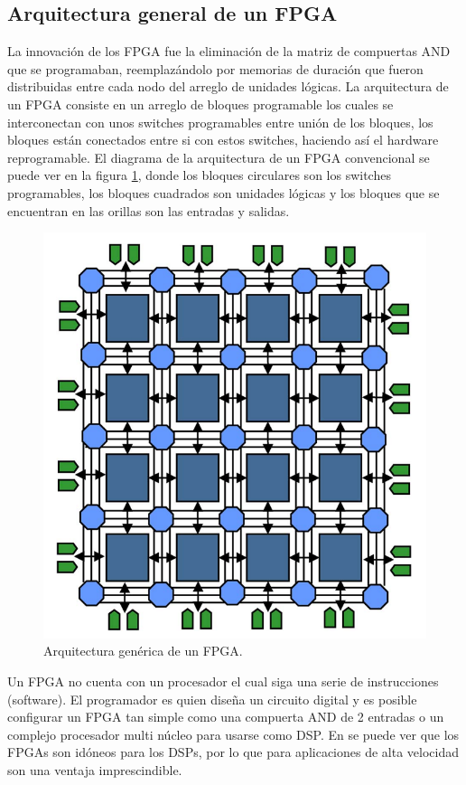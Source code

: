 \documentclass[twoside,spanish,ESP,MSc]{plantillaLabUPV}
\theoremstyle{definition}
\newcommand{\f}{FPGA }
\newcommand{\fs}{FPGAs }
\begin{document}
\subsection{Arquitectura general de un FPGA}
La innovación de los FPGA fue la eliminación de la matriz de compuertas AND que se programaban, reemplazándolo por memorias de duración que fueron distribuidas entre cada nodo del arreglo de unidades lógicas. La arquitectura de un \f consiste en un arreglo de bloques programable los cuales se interconectan con unos switches programables entre unión de los bloques, los bloques están conectados entre si con estos switches, haciendo así el hardware reprogramable. El diagrama de la arquitectura de un \f convencional se puede ver en la figura \ref{arqf}, donde los bloques circulares son los switches programables, los bloques cuadrados son unidades lógicas y los bloques que se encuentran en las orillas son las entradas y salidas. 

\begin{figure}[h]
\centering
\includegraphics[scale=0.3]{ima/arqf.png}
\caption{Arquitectura genérica de un FPGA.%
\label{arqf}}
\end{figure}

Un \f no cuenta con un procesador el cual siga una serie de instrucciones (software). El programador es quien diseña un circuito digital y es posible configurar un \f tan simple como una compuerta AND de 2 entradas o un complejo procesador multi núcleo para usarse como DSP. En \cite{bajaj} se puede ver que los \fs son idóneos para los DSPs, por lo que para aplicaciones de alta velocidad son una ventaja imprescindible.\\
\end{document}
